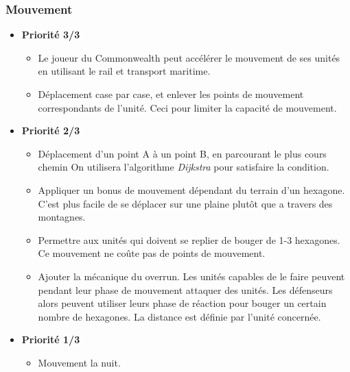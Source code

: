 \documentclass{article}[a4paper, 12pt]
\begin{document}
\subsubsection{Mouvement}
\begin{itemize}
    \item \textbf{Priorité 3/3}
    \begin{itemize}
        \item Le joueur du Commonwealth peut accélérer le mouvement de ses unités en utilisant le rail et transport maritime.
        \item Déplacement case par case, et enlever les points de mouvement correspondants de l'unité. Ceci pour limiter la capacité de mouvement.
    \end{itemize}
    \item \textbf{Priorité 2/3}
    \begin{itemize}
        \item Déplacement d'un point A à un point B, en parcourant le plus cours chemin
            On utilisera l'algorithme \emph{Dijkstra} pour satisfaire la condition.
        \item Appliquer un bonus de mouvement dépendant du terrain d'un hexagone. C'est plus facile de se déplacer sur une plaine plutôt que a travers des montagnes.
        \item Permettre aux unités qui doivent se replier de bouger de 1-3 hexagones. Ce mouvement ne coûte pas de points de mouvement.
        \item Ajouter la mécanique du overrun. Les unités capables de le faire peuvent pendant leur phase de mouvement attaquer des unités. Les défenseurs alors peuvent utiliser leurs phase de réaction pour bouger un certain nombre de hexagones. La distance est définie par l'unité concernée.
    \end{itemize}   
    \item \textbf{Priorité 1/3}
    \begin{itemize}
        \item Mouvement la nuit.
    \end{itemize}
\end{itemize}
\end{document}
